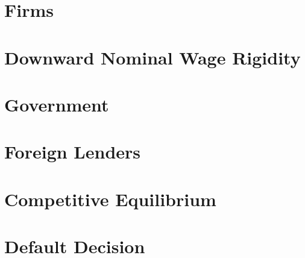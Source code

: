 \section{Firms}


\section{Downward Nominal Wage Rigidity}


\section{Government}


\section{Foreign Lenders}


\section{Competitive Equilibrium}


\section{Default Decision}

